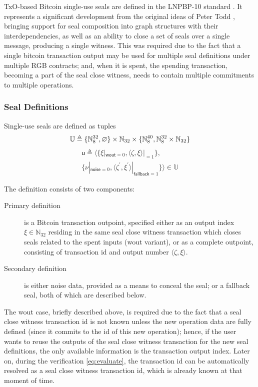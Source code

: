 \documentclass[9pt,oneside]{amsart}
\begin{document}
\begin{multicols}{2}
TxO-based Bitcoin single-use seals are defined in the LNPBP-10 standard \cite{LNPBP10}.
It represents a significant development from the original ideas of Peter Todd \cite{SUS1, SUS2},
bringing support for seal composition into graph structures with their interdependencies,
as well as an ability to close a set of seals over a single message, producing a single witness.
This was required due to the fact that a single bitcoin transaction output may be used
for multiple seal definitions under multiple RGB contracts;
and, when it is spent, the spending transaction, becoming a part of the \gls{seal close witness},
needs to contain multiple commitments to multiple operations.

\subsubsection{Seal Definitions}

Single-use seals are defined as tuples
\noindent
\begin{equation}
    \mathbb{U} \triangleq \{ \mathbb{N}_8^{32}, \varnothing \} \times \mathbb{N}_{32} \times \{ \mathbb{N}_8^{40}, \mathbb{N}_8^{32} \times \mathbb{N}_{32} \} \\
\end{equation}
\begin{multline}
    \mathsf{u} \triangleq \big\langle \{\xi|_{\mathsf{wout}=0}, \langle \zeta, \xi\rangle|_{=1} \}, \\
        \{\nu|_{\mathsf{noise}=0}, \langle \zeta^\prime, \xi^\prime\rangle|_{\mathsf{fallback}=1} \} \big\rangle \in \mathbb{U}
\end{multline}

The definition consists of two components:
\begin{description}
\item[Primary definition] is a Bitcoin transaction outpoint,
    specified either as an output index $\xi \in \mathbb{N}_{32}$
    residing in the same \gls{seal close witness transaction} which closes seals related to the spent inputs
    (\textsf{wout} variant), or as a complete outpoint,
    consisting of transaction id and output number $\langle \zeta, \xi\rangle$.
\item[Secondary definition] is either noise data, provided as a means to conceal the seal;
    or a \gls{fallback seal}, both of which are described below.
\end{description}

The \textsf{wout} case, briefly described above, is required due to the fact that
a \gls{seal close witness transaction} id is not known unless the new operation data are fully defined
(since it commits to the id of this new operation);
hence, if the user wants to reuse the outputs of
the \gls{seal close witness transaction} for the new seal definitions,
the only available information is the transaction output index.
Later on, during the verification \ref{eq:evaluate},
the transaction id can be automatically resolved
as a \gls{seal close witness transaction} id,
which is already known at that moment of time.


\end{multicols}
\end{document}
